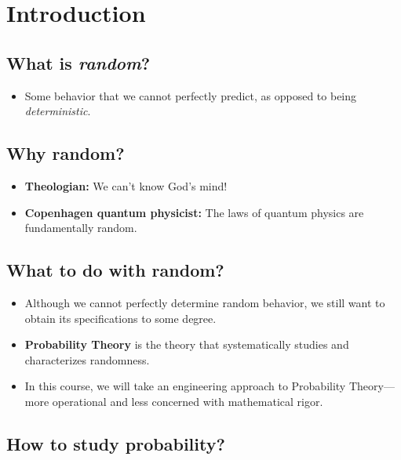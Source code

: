 \section{Introduction}

\subsection{What is \textit{random}?}

\begin{itemize}
\item Some behavior that we cannot perfectly predict, as opposed to being \textit{deterministic}.
\end{itemize}

\subsection{Why random?}

\begin{itemize}
\item \textbf{Theologian:} We can't know God's mind!
\item \textbf{Copenhagen quantum physicist:} The laws of quantum physics are fundamentally random.
\end{itemize}

\subsection{What to do with random?}

\begin{itemize}
\item Although we cannot perfectly determine random behavior, we still want to obtain its specifications to some degree.
\item \textbf{Probability Theory} is the theory that systematically studies and characterizes randomness.
\item In this course, we will take an engineering approach to Probability Theory---more operational and less concerned with mathematical rigor.
\end{itemize}

\subsection{How to study probability?}

